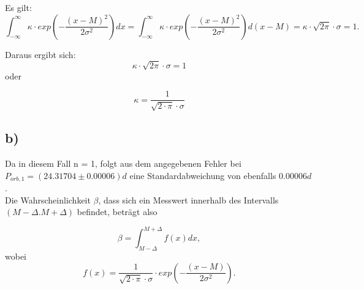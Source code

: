 \documentclass[titlepage]{scrartcl}
\begin{document}
Es gilt:
\begin{equation}
\int_{-\infty} ^{\infty} \kappa \cdot exp(-\frac{(x-M)^2}{2\sigma^2}) dx = \int_{-\infty} ^{\infty} \kappa \cdot exp(-\frac{(x-M)^2}{2\sigma^2}) d(x-M) = \kappa \cdot \sqrt {2\pi} \cdot \sigma = 1. 
\end{equation}

Daraus ergibt sich: 
\begin{equation}
\kappa \cdot \sqrt{2\pi} \cdot \sigma = 1
\end{equation} oder


\begin{equation}
\kappa = \frac{1}{\sqrt{2\cdot \pi} \cdot \sigma}
\end{equation}
\subsection{b)}
Da in diesem Fall n = 1, folgt aus dem angegebenen Fehler bei $P_{orb, 1} = (24.31704 \pm 0.00006) d$ eine Standardabweichung von ebenfalls $0.00006 d$. \\
Die Wahrscheinlichkeit $\beta$, dass sich ein Messwert innerhalb des Intervalls $ (M-\Delta. M+ \Delta)$ befindet, beträgt also 

\begin{equation}
\beta = \int_{M - \Delta}^{M + \Delta} f(x) dx, 
\end{equation}
wobei 
\begin{equation}
f(x) = \frac{1}{\sqrt{2\cdot \pi} \cdot \sigma} \cdot exp(-\frac{(x-M)}{2\sigma^2}). 
\end{equation}
\end{document}
